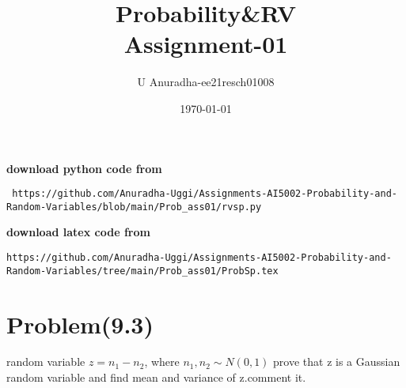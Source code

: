 \documentclass[journal,12pt,twocolumn]{IEEEtran}
\title{Probability\&RV \\ Assignment-01}
\author{U Anuradha-ee21resch01008}
\date{\today}
\begin{document}
\maketitle
\newpage
\bigskip
\renewcommand{\thefigure}{\theenumi}
\renewcommand{\thetable}{\theenumi}
\textbf{download python code from}
\begin{lstlisting}
 https://github.com/Anuradha-Uggi/Assignments-AI5002-Probability-and-Random-Variables/blob/main/Prob_ass01/rvsp.py
\end{lstlisting}
\textbf{download latex code from}
\begin{lstlisting}
https://github.com/Anuradha-Uggi/Assignments-AI5002-Probability-and-Random-Variables/tree/main/Prob_ass01/ProbSp.tex
\end{lstlisting}


\section{Problem(9.3)}
random variable $z=n_1-n_2$, where $n_1,n_2\sim N(0,1)$
prove that z is a Gaussian random variable and find mean and variance of z.comment it.
\end{document}
